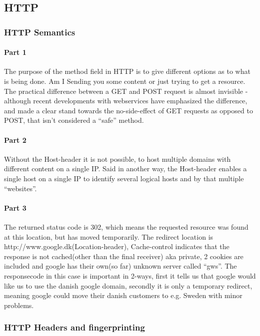 \subsection{HTTP}

\subsubsection{HTTP Semantics}
\paragraph{Part 1} The purpose of the method field in HTTP is to give different
options as to what is being done. Am I Sending you some content or just trying
to get a resource. The practical difference between a GET and POST request is
almost invisible - although recent developments with webservices have
emphasized the difference, and made a clear stand towards the no-side-effect of
GET requests as opposed to POST, that isn't considered a ``safe'' method.

\paragraph{Part 2} Without the Host-header it is not possible, to host multiple
domains with different content on a single IP. Said in another way, the
Host-header enables a single host on a single IP to identify several logical
hosts and by that multiple ``websites''.

\paragraph{Part 3} The returned status code is 302, which means the requested
resource was found at this location, but has moved temporarily. The redirect
location is http://www.google.dk(Location-header), Cache-control indicates that
the response is not cached(other than the final receiver) aka private, 2 
cookies are included and google has their own(so far) unknown server called 
``gws''. The responsecode in this case is important in 2-ways, first it tells
us that google would like us to use the danish google domain, secondly it is
only a temporary redirect, meaning google could move their danish customers to
e.g. Sweden with minor problems.

\subsubsection{HTTP Headers and fingerprinting}
